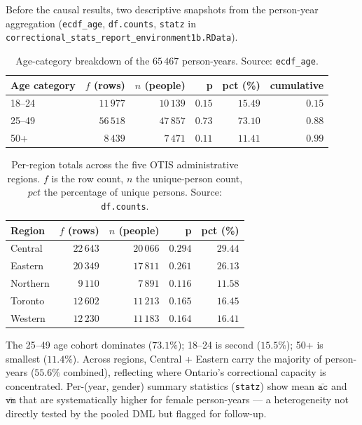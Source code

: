 \documentclass[11pt,a4paper]{article}
\newcommand{\1}{\mathbf{1}}
\theoremstyle{plain}
\theoremstyle{definition}
\begin{document}
Before the causal results, two descriptive snapshots from the
person-year aggregation (\texttt{ecdf\_age},
\texttt{df.counts}, \texttt{statz} in
\texttt{correctional\_stats\_report\_environment1b.RData}).

\begin{table}[h]
\centering\footnotesize
\caption{Age-category breakdown of the $65\,467$ person-years.
Source: \texttt{ecdf\_age}.}\label{tab:ecdf-age}
\begin{tabular}{lrrrrr}
\toprule
Age category & $f$ (rows) & $n$ (people) & p & pct (\%) & cumulative\\\midrule
18--24 & $11\,977$ & $10\,139$ & $0.15$ & $15.49$ & $0.15$\\
25--49 & $56\,518$ & $47\,857$ & $0.73$ & $73.10$ & $0.88$\\
50+    & $\phantom{0}8\,439$ & $\phantom{0}7\,471$ & $0.11$ & $11.41$ & $0.99$\\\bottomrule
\end{tabular}
\end{table}

\begin{table}[h]
\centering\footnotesize
\caption{Per-region totals across the five OTIS administrative
regions.  $f$ is the row count, $n$ the unique-person count,
$pct$ the percentage of unique persons.
Source: \texttt{df.counts}.}\label{tab:df-counts}
\begin{tabular}{lrrrr}
\toprule
Region & $f$ (rows) & $n$ (people) & p & pct (\%)\\\midrule
Central  & $22\,643$ & $20\,066$ & $0.294$ & $29.44$\\
Eastern  & $20\,349$ & $17\,811$ & $0.261$ & $26.13$\\
Northern & $\phantom{0}9\,110$ & $\phantom{0}7\,891$ & $0.116$ & $11.58$\\
Toronto  & $12\,602$ & $11\,213$ & $0.165$ & $16.45$\\
Western  & $12\,230$ & $11\,183$ & $0.164$ & $16.41$\\\bottomrule
\end{tabular}
\end{table}

The 25--49 age cohort dominates ($73.1\%$); 18--24 is
second ($15.5\%$); 50+ is smallest ($11.4\%$).  Across regions,
Central + Eastern carry the majority of person-years
($55.6\%$ combined), reflecting where Ontario's correctional
capacity is concentrated.  Per-(year, gender) summary statistics
(\texttt{statz}) show mean $\bar{\texttt{ac}}$ and
$\bar{\texttt{vm}}$ that are systematically higher for female
person-years — a heterogeneity not directly tested by the pooled
DML but flagged for follow-up.
\end{document}
